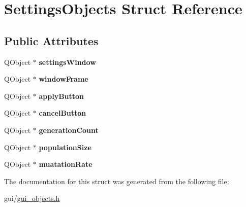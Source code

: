 \hypertarget{struct_settings_objects}{}\section{Settings\+Objects Struct Reference}
\label{struct_settings_objects}
\subsection*{Public Attributes}
\begin{DoxyCompactItemize}
\item 
\mbox{\label{struct_settings_objects_a1465135bbf10a760939530207947dfb9}} 
Q\+Object $\ast$ {\bfseries settings\+Window}
\item 
\mbox{\label{struct_settings_objects_ae363eaa2d19dcf059f6942671dc57ac1}} 
Q\+Object $\ast$ {\bfseries window\+Frame}
\item 
\mbox{\label{struct_settings_objects_a47e1f4fb77fbe8b9d266d72a29ae14ad}} 
Q\+Object $\ast$ {\bfseries apply\+Button}
\item 
\mbox{\label{struct_settings_objects_a38e270896622f9fd547a8ecf57f18d95}} 
Q\+Object $\ast$ {\bfseries cancel\+Button}
\item 
\mbox{\label{struct_settings_objects_aa7f9b4ac54e2ce6ee0252e189f41e9aa}} 
Q\+Object $\ast$ {\bfseries generation\+Count}
\item 
\mbox{\label{struct_settings_objects_a077dcdc6e5bf2d1a62726459a5d74c40}} 
Q\+Object $\ast$ {\bfseries population\+Size}
\item 
\mbox{\label{struct_settings_objects_a9e1067f96e2ee0aead5d12b8c664d7e2}} 
Q\+Object $\ast$ {\bfseries muatation\+Rate}
\end{DoxyCompactItemize}


The documentation for this struct was generated from the following file\+:\begin{DoxyCompactItemize}
\item 
gui/\hyperlink{gui__objects_8h}{gui\+\_\+objects.\+h}\end{DoxyCompactItemize}
